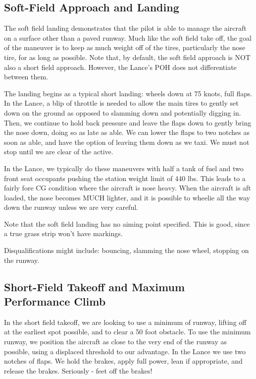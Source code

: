 \subsection{Soft-Field Approach and Landing}

The soft field landing demonstrates that the pilot is able to manage the aircraft on a surface other than a paved runway. Much like the soft field take off, the goal of the maneuver is to keep as much weight off of the tires, particularly the nose tire, for as long as possible. Note that, by default, the soft field approach is NOT also a short field approach. However, the Lance's POH does not differentiate between them.

The landing begins as a typical short landing: wheels down at 75 knots, full flaps. In the Lance, a blip of throttle is needed to allow the main tires to gently set down on the ground as opposed to slamming down and potentially digging in. Then, we continue to hold back pressure and leave the flaps down to gently bring the nose down, doing so as late as able. We can lower the flaps to two notches as soon as able, and have the option of leaving them down as we taxi. We must not stop until we are clear of the active.

In the Lance, we typically do these maneuvers with half a tank of fuel and two front seat occupants pushing the station weight limit of 440 lbs. This leads to a fairly fore CG condition where the aircraft is nose heavy. When the aircraft is aft loaded, the nose becomes MUCH lighter, and it is possible to wheelie all the way down the runway unless we are very careful.

Note that the soft field landing has no aiming point specified. This is good, since a true grass strip won't have markings.

Disqualifications might include: bouncing, slamming the nose wheel, stopping on the runway.

\subsection{Short-Field Takeoff and Maximum Performance Climb}

In the short field takeoff, we are looking to use a minimum of runway, lifting off at the earliest spot possible, and to clear a 50 foot obstacle. To use the minimum runway, we position the aircraft as close to the very end of the runway as possible, using a displaced threshold to our advantage. In the Lance we use two notches of flaps. We hold the brakes, apply full power, lean if appropriate, and release the brakes. Seriously - feet off the brakes!

